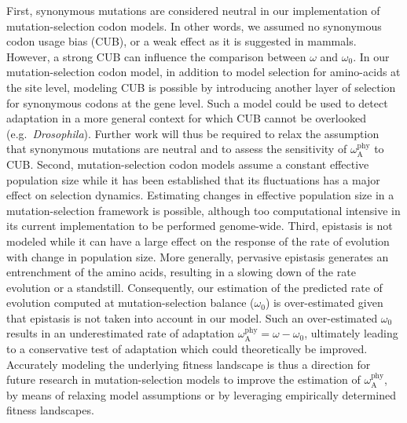 \documentclass{article}
\newcommand{\rateApop}{\omega_{\mathrm{A}}}
\newcommand{\rateAphy}{\rateApop^{\mathrm{phy}}}
\begin{document}
    First, synonymous mutations are considered neutral in our implementation of mutation-selection codon models.
    In other words, we assumed no synonymous codon usage bias (CUB), or a weak effect as it is suggested in mammals\cite{plotkin_synonymous_2011}.
    However, a strong CUB can influence the comparison between $\omega$ and $\omega_0$\cite{spielman_relationship_2015}.
    In our mutation-selection codon model, in addition to model selection for amino-acids at the site level, modeling CUB is possible by introducing another layer of selection for synonymous codons at the gene level\cite{yang_mutationselection_2008, rodrigue_mechanistic_2010}.
    Such a model could be used to detect adaptation in a more general context for which CUB cannot be overlooked (e.g.~\textit{Drosophila}).
    Further work will thus be required to relax the assumption that synonymous mutations are neutral and to assess the sensitivity of $\rateAphy$ to CUB.
    Second, mutation-selection codon models assume a constant effective population size while it has been established that its fluctuations has a major effect on selection dynamics\cite{lanfear_population_2014, platt_protein_2018}.
    Estimating changes in effective population size in a mutation-selection framework is possible\cite{latrille_inferring_2021}, although too computational intensive in its current implementation to be performed genome-wide.
    Third, epistasis is not modeled while it can have a large effect on the response of the rate of evolution with change in population size\cite{latrille_quantifying_2021}.
    More generally, pervasive epistasis generates an entrenchment of the amino acids\cite{goldstein_evolutionary_2004, goldstein_nonadaptive_2015, goldstein_sequence_2017}, resulting in a slowing down of the rate evolution\cite{rodrigue_detecting_2017, patel_epistasis_2022} or a standstill\cite{youssef_evolution_2022}.
    Consequently, our estimation of the predicted rate of evolution computed at mutation-selection balance ($\omega_0$) is over-estimated given that epistasis is not taken into account in our model.
    Such an over-estimated $\omega_0$ results in an underestimated rate of adaptation $\rateAphy = \omega - \omega_0$, ultimately leading to a conservative test of adaptation which could theoretically be improved.
    Accurately modeling the underlying fitness landscape is thus a direction for future research in mutation-selection models to improve the estimation of $\rateAphy$, by means of relaxing model assumptions\cite{goldstein_sequence_2017} or by leveraging empirically determined fitness landscapes\cite{bloom_identification_2017, schrempf_scalable_2020}.
\end{document}

